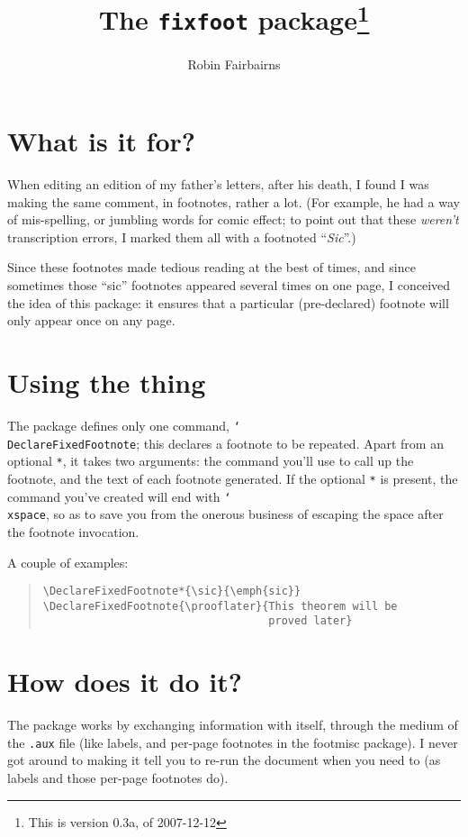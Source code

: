 \documentclass[a4paper]{article}
\providecommand\cs[1]{\texttt{\char`\\#1}}
\begin{document}
\title{The \texttt{fixfoot} package\thanks{This is version 0.3a, of
    2007-12-12}}
\author{Robin Fairbairns}
\maketitle

\section{What is it for?}

When editing an edition of my father's letters, after his death, I
found I was making the same comment, in footnotes, rather a lot.  (For
example, he had a way of mis-spelling, or jumbling words for comic
effect; to point out that these \emph{weren't} transcription errors, I
marked them all with a footnoted ``\emph{Sic}''.)

Since these footnotes made tedious reading at the best of times, and
since sometimes those ``sic'' footnotes appeared several times on one
page, I conceived the idea of this package: it ensures that a
particular (pre-declared) footnote will only appear once on any page.

\section{Using the thing}

The package defines only one command, \cs{DeclareFixedFootnote}; this
declares a footnote to be repeated.  Apart from an optional
\texttt{*}, it takes two arguments: the command you'll use to call up
the footnote, and the text of each footnote generated.
If the optional \texttt{*} is present, the command you've created will
end with \cs{xspace}, so as to save you from the onerous business of
escaping the space after the footnote invocation.

A couple of examples:
\begin{quote}
\begin{verbatim}
\DeclareFixedFootnote*{\sic}{\emph{sic}}
\DeclareFixedFootnote{\prooflater}{This theorem will be
                                   proved later}
\end{verbatim}
\end{quote}

\section{How does it do it?}

The package works by exchanging information with itself, through the
medium of the \texttt{.aux} file (like labels, and per-page footnotes
in the \textsf{footmisc} package).  I never got around to making it
tell you to re-run the document when you need to (as labels and those
per-page footnotes do).
\end{document}
